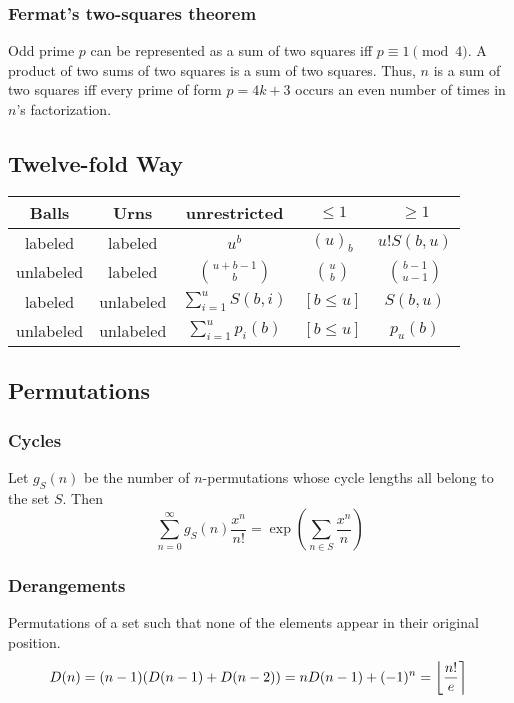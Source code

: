 {\subsubsection{Fermat's two-squares theorem}  Odd prime $p$ can be represented
as a sum of two squares iff $p \equiv 1 {\pmod 4}$.
A product of two sums of two squares is a sum of two squares.
Thus, $n$ is a sum of two squares iff every prime of
form $p=4k+3$ occurs an even number of times in $n$'s factorization.


\subsection{Twelve-fold Way}
\begin{center}
\begin{tabular}{c|c|c|c|c}
\textbf{Balls} & \textbf{Urns} & \textbf{unrestricted} & $\leq 1$ & $\geq 1$ \\ 
\hline
labeled & labeled & $u^b$ & $(u)_b$ & $u! S(b, u)$ \\ 
unlabeled & labeled & $\binom{u + b - 1}{b}$ & $\binom{u}{b}$ & $\binom{b-1}{u-1}$ \\ 
labeled & unlabeled & $\sum_{i=1}^u S(b, i)$ & $[b \leq u]$ & $S(b, u)$ \\ 
unlabeled & unlabeled & $\sum_{i=1}^u p_i(b)$ & $[b \leq u]$ & $p_u(b)$ \\ 
\end{tabular}
\end{center}

\subsection{Permutations}
  \subsubsection{Cycles}
    Let $g_S(n)$ be the number of $n$-permutations whose cycle lengths all belong to the set $S$. Then
    $$\sum_{n=0} ^\infty g_S(n) \frac{x^n}{n!} = \exp\left(\sum_{n\in S} \frac{x^n} {n} \right)$$

  \subsubsection{Derangements}
    Permutations of a set such that none of the elements appear in their original position.
    \[ \mkern-2mu D(n) = (n-1)(D(n-1)+D(n-2)) = n D(n-1)+(-1)^n = \left\lfloor\frac{n!}{e}\right\rceil \]

}
